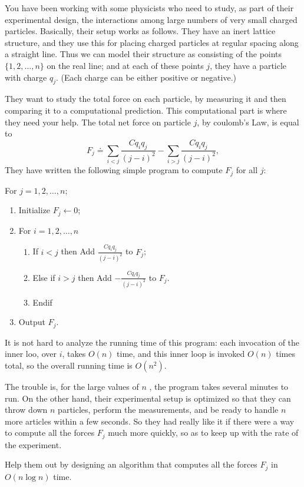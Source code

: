 \documentclass[11pt]{article}
\theoremstyle{numberplain}
\theoremstyle{nonumberplain}
\newcommand{\0}{{\mathbf{0}}}
\begin{document}
\begin{ques}[HW4, 5-4] You have been working with some physicists who need to study, as part of their experimental design, the interactions among large numbers of very small charged particles. Basically, their setup works as follows. They have an inert lattice structure, and they use this for placing charged particles at regular spacing along a straight line. Thus we can model their structure as consisting of the points $\{1,2,\ldots, n\}$ on the real line; and at each of these points $j$, they have a particle with charge $q_j$. (Each charge can be either positive or negative.)\par 
They want to study the total force on each particle, by measuring it and then comparing it to a computational  prediction. This computational part is where they need your help. The total net force on particle $j$, by coulomb's Law, is equal to 
$$
F_j\doteq \sum_{i<j}\frac{Cq_iq_j}{(j-i)^2}-\sum_{i>j}\frac{Cq_iq_j}{(j-i)^2},
$$
They have written the following simple program to compute $F_j$ for all $j$:
\begin{code}
For $j=1,2,\ldots, n$;
\begin{enumerate}
\item Initialize $F_j\leftarrow 0$;
\item For $i=1,2,\ldots, n$
\begin{enumerate}
\item If $i<j$ then Add $\frac{Cq_iq_j}{(j-i)^2}$ to $F_j$;
\item Else if $i>j$ then Add $-\frac{Cq_iq_j}{(j-i)^2}$ to $F_j$. 
\item Endif
\end{enumerate}
\item Output $F_j$.
\end{enumerate}
It is not hard to analyze the running time of this program: each invocation of the inner loo, over $i$, takes $O(n)$ time, and this inner loop is invoked $O(n)$ times total, so the overall running time is $O(n^2)$.\par 
The trouble is, for the large values of $n$ , the program takes several minutes to run. On the other hand, their experimental setup is optimized so that they can throw down $n$ particles, perform the measurements, and be ready to handle $n$ more articles within a few seconds. So they had really like it if there were a way to compute all the forces $F_j$ much more quickly, so as to keep up with the rate of the experiment.\par 
Help them out by designing an algorithm that computes all the forces $F_j$ in $O(n\log n)$ time.
\end{code}
\end{ques}
\end{document}
